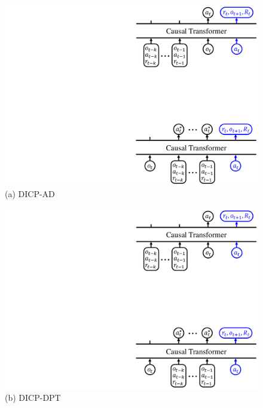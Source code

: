 \documentclass{article}
\begin{document}
\begin{figure}[t]
    \begin{center}
    \begin{minipage}{0.35\textwidth}
        \begin{center}
        \includegraphics[width=\textwidth, trim={412pt 372pt 4pt 6pt}, clip]{figures/architecture-1.pdf} \\
        \caption*{(a) DICP-AD}
        \vspace{0.30cm}
        \includegraphics[width=\textwidth, trim={413pt 6pt 6pt 372pt}, clip]{figures/architecture-1.pdf}
        \caption*{(b) DICP-DPT}
        \end{center}
    \end{minipage}%
    \hfill
    \begin{minipage}{0.64\textwidth}

\end{minipage}
\end{center}
\end{figure}
\end{document}
